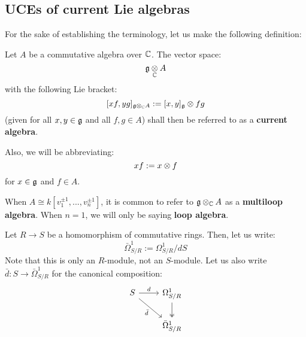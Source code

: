     \subsection{UCEs of current Lie algebras}
        For the sake of establishing the terminology, let us make the following definition:
        \begin{definition} \label{def: current_algebras}
            Let $A$ be a commutative algebra over $\mathbb{C}$. The vector space:
                $$\g \tensor_{\bbC} A$$
            with the following Lie bracket:
                $$[x f, y g]_{\g \tensor_{\bbC} A} := [x, y]_{\g} \tensor fg$$
            (given for all $x, y \in \mathfrak{g}$ and all $f, g \in A$) shall then be referred to as a \textbf{current algebra}. 
                
            Also, we will be abbreviating:
                $$xf := x \tensor f$$
            for $x \in \mathfrak{g}$ and $f \in A$.
        \end{definition}
        \begin{remark}
            When $A \cong k[v_1^{\pm 1}, ..., v_n^{\pm 1}]$, it is common to refer to $\g \tensor_{\bbC} A$ as a \textbf{multiloop algebra}. When $n = 1$, we will only be saying \textbf{loop algebra}.
        \end{remark}

        \begin{convention}
            Let $R \to S$ be a homomorphism of commutative rings. Then, let us write:
                $$\bar{\Omega}^1_{S/R} := \Omega^1_{S/R}/dS$$
            Note that this is only an $R$-module, not an $S$-module. Let us also write $\bar{d}: S \to \bar{\Omega}^1_{S/R}$ for the canonical composition:
                $$
                    \begin{tikzcd}
                	S & {\Omega^1_{S/R}} \\
                	& {\bar{\Omega}^1_{S/R}}
                	\arrow["d", from=1-1, to=1-2]
                	\arrow[two heads, from=1-2, to=2-2]
                	\arrow["{\bar{d}}"', from=1-1, to=2-2]
                    \end{tikzcd}
                $$
        \end{convention}

